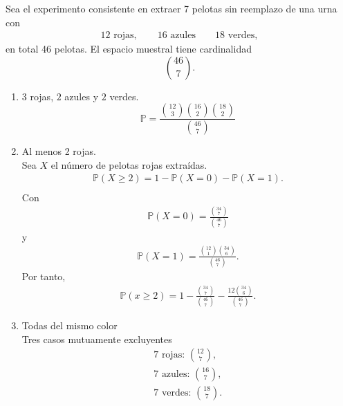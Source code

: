 \message{ !name(tarea2.tex)}\documentclass[12pt,a4paper]{article}
\begin{document}
    \begin{solucion}
        Sea el experimento consistente en extraer 7 pelotas sin reemplazo de una urna con
        \begin{align*}
            12\text{ rojas},\qquad16\text{ azules}\qquad18\text{ verdes},
        \end{align*}
        en total 46 pelotas. El espacio muestral tiene cardinalidad
        \begin{equation*}
            \binom{46}{7}.
        \end{equation*}
        \begin{enumerate}
            \item[(a)] $3$ rojas, $2$ azules y $2$ verdes.
            \begin{equation*}
                \mathbb{P}=\frac{\binom{12}{3}\binom{16}{2}\binom{18}{2}}{\binom{46}{7}}
            \end{equation*}
            \item[(b)] Al menos 2 rojas.\\
            Sea $X$ el número de pelotas rojas extraídas.
            \begin{align*}
                \mathbb{P}(X\geq2)=1-\mathbb{P}(X=0)-\mathbb{P}(X=1).\\
            \end{align*}
            Con
            \begin{align*}
                \mathbb{P}(X=0)=\frac{\binom{34}{7}}{\binom{46}{7}}
            \end{align*}
            y
            \begin{align*}
                \mathbb{P}(X=1)=\frac{\binom{12}{1}\binom{34}{6}}{\binom{46}{7}}.
            \end{align*}
            Por tanto,
            \begin{align*}
                \mathbb{P}(x\geq2)=1-\frac{\binom{34}{7}}{\binom{46}{7}}-\frac{12\binom{34}{6}}{\binom{46}{7}}.
            \end{align*}
            \item[(c)] Todas del mismo color\\
            Tres casos mutuamente excluyentes
            \begin{align*}
                7\text{ rojas: }\binom{12}{7},\\
                7\text{ azules: }\binom{16}{7},\\
                7\text{ verdes: }\binom{18}{7}.
            \end{align*}

\end{enumerate}
\end{solucion}
\end{document}

